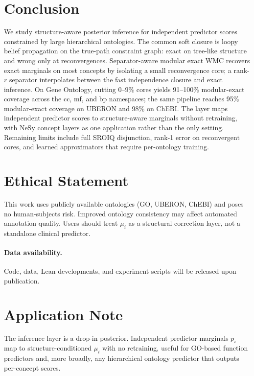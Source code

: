 \documentclass[letterpaper]{article}
\begin{document}
\section{Conclusion}\label{sec:conclusion}
We study structure-aware posterior inference for independent predictor scores constrained by large hierarchical ontologies. The common soft closure is loopy belief propagation on the true-path constraint graph: exact on tree-like structure and wrong only at reconvergences. Separator-aware modular exact WMC recovers exact marginals on most concepts by isolating a small reconvergence core; a rank-$r$ separator interpolates between the fast independence closure and exact inference. On Gene Ontology, cutting 0--9\% cores yields 91--100\% modular-exact coverage across the cc, mf, and bp namespaces; the same pipeline reaches 95\% modular-exact coverage on UBERON and 98\% on ChEBI. The layer maps independent predictor scores to structure-aware marginals without retraining, with NeSy concept layers as one application rather than the only setting. Remaining limits include full SROIQ disjunction, rank-1 error on reconvergent cores, and learned approximators that require per-ontology training.

\section{Ethical Statement}
This work uses publicly available ontologies (GO, UBERON, ChEBI) and poses no human-subjects risk. Improved ontology consistency may affect automated annotation quality. Users should treat $\mu_i$ as a structural correction layer, not a standalone clinical predictor.

\paragraph{Data availability.}
Code, data, Lean developments, and experiment scripts will be released upon publication.



\appendix

\section{Application Note}
The inference layer is a drop-in posterior. Independent predictor marginals $p_i$ map to structure-conditioned $\mu_i$ with no retraining, useful for GO-based function predictors \citep{kulmanov2020deepgoplus,lin2023esm2,yu2023clean,kulmanov2018deepgo,kulmanov2022deepgozero} and, more broadly, any hierarchical ontology predictor that outputs per-concept scores.
\end{document}
